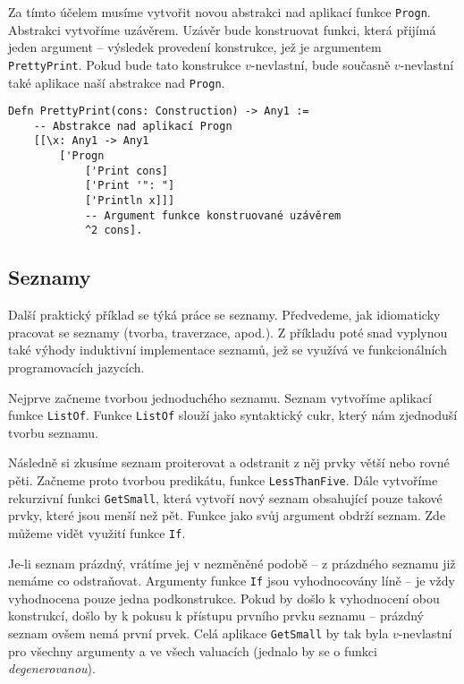 Za tímto účelem musíme vytvořit novou abstrakci nad aplikací funkce \lstinline{Progn}. Abstrakci
vytvoříme uzávěrem. Uzávěr bude konstruovat funkci, která přijímá jeden argument -- výsledek
provedení konstrukce, jež je argumentem \lstinline{PrettyPrint}. Pokud bude tato konstrukce
$v$-nevlastní, bude současně $v$-nevlastní také aplikace naší abstrakce nad \lstinline{Progn}.

\begin{lstlisting}[caption={Funkce a uzávěry}]
Defn PrettyPrint(cons: Construction) -> Any1 :=
    -- Abstrakce nad aplikací Progn
    [[\x: Any1 -> Any1
        ['Progn
            ['Print cons]
            ['Print '": "]
            ['Println x]]]
            -- Argument funkce konstruované uzávěrem
            ^2 cons].
\end{lstlisting}

\subsection{Seznamy}

Další praktický příklad se týká práce se seznamy. Předvedeme, jak idiomaticky pracovat se seznamy
(tvorba, traverzace, apod.). Z příkladu poté snad vyplynou také výhody induktivní implementace
seznamů, jež se využívá ve funkcionálních programovacích jazycích.

Nejprve začneme tvorbou jednoduchého seznamu. Seznam vytvoříme aplikací funkce \lstinline{ListOf}.
Funkce \lstinline{ListOf} slouží jako syntaktický cukr, který nám zjednoduší tvorbu seznamu.

Následně si zkusíme seznam proiterovat a odstranit z něj prvky větší nebo rovné pěti. Začneme proto
tvorbou predikátu, funkce \lstinline{LessThanFive}. Dále vytvoříme rekurzivní funkci
\lstinline{GetSmall}, která vytvoří nový seznam obsahující pouze takové prvky, které jsou menší než
pět. Funkce jako svůj argument obdrží seznam. Zde můžeme vidět využití funkce \lstinline{If}.

Je-li seznam prázdný, vrátíme jej v nezměněné podobě -- z prázdného seznamu již nemáme co
odstraňovat. Argumenty funkce \lstinline{If} jsou vyhodnocovány líně -- je vždy vyhodnocena pouze
jedna podkonstrukce. Pokud by došlo k vyhodnocení obou konstrukcí, došlo by k pokusu k přístupu
prvního prvku seznamu -- prázdný seznam ovšem nemá první prvek. Celá aplikace \lstinline{GetSmall}
by tak byla $v$-nevlastní pro všechny argumenty a ve všech valuacích (jednalo by se o funkci
\textit{degenerovanou}).

